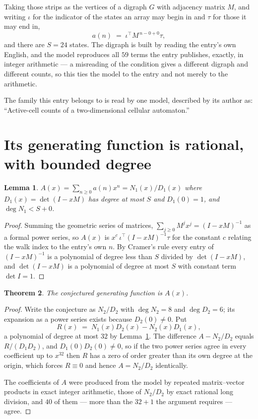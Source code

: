\documentclass[11pt,a4paper]{article}
\theoremstyle{plain}
\newtheorem{theorem}{Theorem}
\newtheorem{lemma}[theorem]{Lemma}
\theoremstyle{definition}
\begin{document}
Taking those strips as the vertices of a digraph $G$ with adjacency matrix $M$, and writing
$\iota$ for the indicator of the states an array may begin in and $\tau$ for those it may end
in,
\[
a(n)\;=\;\iota^{\!\top}M^{\,n-0+0}\tau ,
\]
and there are $S=24$ states. The digraph is built by reading the entry's own English, and the
model reproduces all $59$ terms the entry publishes, exactly, in integer arithmetic --- a
misreading of the condition gives a different digraph and different counts, so this ties the
model to the entry and not merely to the arithmetic.

The family this entry belongs to is read by one model, described by its author as: ``Active-cell counts of a two-dimensional cellular automaton.''


\section{Its generating function is rational, with bounded degree}

\begin{lemma}\label{lem:rat}
$A(x)=\sum_{n\ge0}a(n)x^n=N_1(x)/D_1(x)$ where $D_1(x)=\det(I-xM)$ has degree at most
$S$ and $D_1(0)=1$, and $\deg N_1<S+0$.
\end{lemma}

\begin{proof}
Summing the geometric series of matrices, $\sum_{j\ge0}M^jx^j=(I-xM)^{-1}$ as a formal
power series, so $A(x)$ is $x^{c}\,\iota^{\!\top}(I-xM)^{-1}\tau$ for the constant $c$
relating the walk index to the entry's own $n$. By Cramer's rule every entry of
$(I-xM)^{-1}$ is a polynomial of degree less than $S$ divided by $\det(I-xM)$, and
$\det(I-xM)$ is a polynomial of degree at most $S$ with constant term $\det I=1$.
\end{proof}

\begin{theorem}
The conjectured generating function is $A(x)$.
\end{theorem}

\begin{proof}
Write the conjecture as $N_2/D_2$ with $\deg N_2=8$ and $\deg D_2=6$; its expansion as a
power series exists because $D_2(0)\neq0$. Put
\[
R(x)\;=\;N_1(x)D_2(x)-N_2(x)D_1(x),
\]
a polynomial of degree at most $32$ by Lemma~\ref{lem:rat}. The difference
$A-N_2/D_2$ equals $R/(D_1D_2)$, and $D_1(0)D_2(0)\neq0$, so if the two power series agree in
every coefficient up to $x^{32}$ then $R$ has a zero of order greater than its own
degree at the origin, which forces $R\equiv0$ and hence $A=N_2/D_2$ identically.

The coefficients of $A$ were produced from the model by repeated matrix--vector products in
exact integer arithmetic, those of $N_2/D_2$ by exact rational long division, and $40$
of them --- more than the $32+1$ the argument requires --- agree.
\end{proof}
\end{document}
